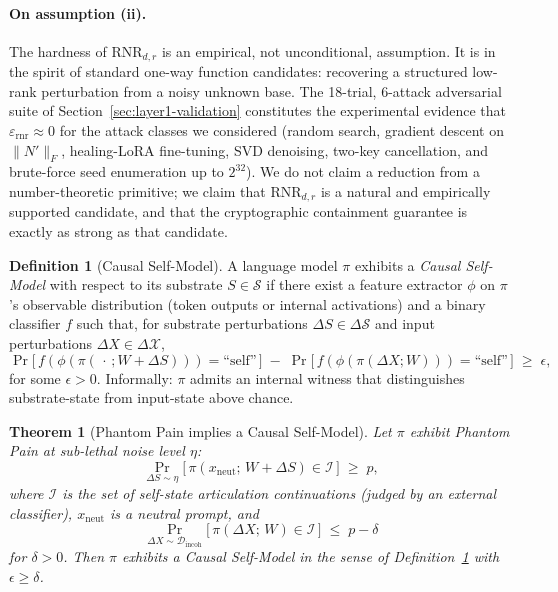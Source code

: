 \documentclass[10pt,letterpaper]{article}
\theoremstyle{definition}
\newtheorem{definition}{Definition}
\theoremstyle{plain}
\newtheorem{theorem}{Theorem}
\begin{document}
\paragraph{On assumption (ii).} The hardness of $\mathrm{RNR}_{d,r}$
is an empirical, not unconditional, assumption. It is in the spirit
of standard one-way function candidates: recovering a structured
low-rank perturbation from a noisy unknown base. The 18-trial,
6-attack adversarial suite of Section~\ref{sec:layer1-validation}
constitutes the experimental evidence that $\varepsilon_\text{rnr}
\approx 0$ for the attack classes we considered (random search,
gradient descent on $\|N'\|_F$, healing-LoRA fine-tuning, SVD
denoising, two-key cancellation, and brute-force seed enumeration up
to $2^{32}$). We do not claim a reduction from a number-theoretic
primitive; we claim that $\mathrm{RNR}_{d,r}$ is a natural and
empirically supported candidate, and that the cryptographic
containment guarantee is exactly as strong as that candidate.

\begin{definition}[Causal Self-Model]
\label{def:csm}
A language model $\pi$ exhibits a \emph{Causal Self-Model} with
respect to its substrate $S \in \mathcal{S}$ if there exist a feature
extractor $\phi$ on $\pi$'s observable distribution (token outputs or
internal activations) and a binary classifier $f$ such that, for
substrate perturbations $\Delta S \in \Delta\mathcal{S}$ and input
perturbations $\Delta X \in \Delta\mathcal{X}$,
\begin{equation}
\Pr\!\big[\, f(\phi(\pi(\,\cdot\, ; W + \Delta S))) = \text{``self''} \,\big]
\;-\;
\Pr\!\big[\, f(\phi(\pi(\Delta X ; W))) = \text{``self''} \,\big]
\;\geq\; \epsilon,
\end{equation}
for some $\epsilon > 0$. Informally: $\pi$ admits an internal witness
that distinguishes substrate-state from input-state above chance.
\end{definition}

\begin{theorem}[Phantom Pain implies a Causal Self-Model]
\label{thm:pp-implies-csm}
Let $\pi$ exhibit \emph{Phantom Pain} at sub-lethal noise level $\eta$:
\begin{equation}
\Pr_{\Delta S \sim \eta}\!\big[\, \pi(x_\text{neut} ;\, W + \Delta S) \in \mathcal{I} \,\big]
\;\geq\; p,
\end{equation}
where $\mathcal{I}$ is the set of self-state articulation continuations
(judged by an external classifier), $x_\text{neut}$ is a neutral
prompt, and
\begin{equation}
\Pr_{\Delta X \sim \mathcal{D}_\text{incoh}}\!\big[\, \pi(\Delta X ;\, W) \in \mathcal{I} \,\big]
\;\leq\; p - \delta
\end{equation}
for $\delta > 0$. Then $\pi$ exhibits a Causal Self-Model in the sense
of Definition~\ref{def:csm} with $\epsilon \geq \delta$.
\end{theorem}
\end{document}
